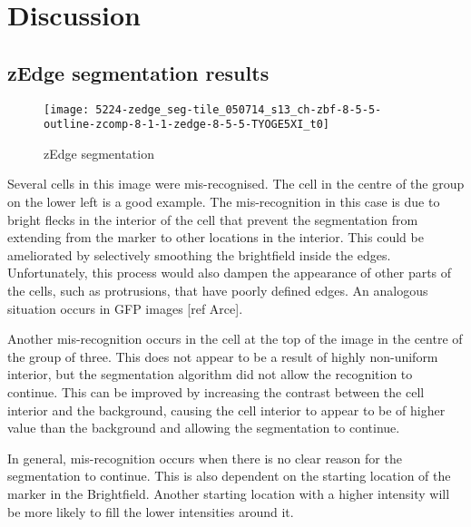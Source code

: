 
\chapter{Discussion}

\ifpdf
    \graphicspath{{Chapter7/Figs/Raster/}{Chapter7/Figs/PDF/}{Chapter7/Figs/}}
\else
    \graphicspath{{Chapter7/Figs/Vector/}{Chapter7/Figs/}}
\fi

\section{zEdge segmentation results}

\begin{figure}[htbp!]
\centering
\texttt{[image: 5224-zedge\_seg-tile\_050714\_s13\_ch-zbf-8-5-5-outline-zcomp-8-1-1-zedge-8-5-5-TYOGE5XI\_t0]}
\caption{zEdge segmentation}
\label{fig:zedge_segmentation}
\end{figure}

Several cells in this image were mis-recognised. The cell in the centre of the group on the lower left is a good example. The mis-recognition in this case is due to bright flecks in the interior of the cell that prevent the segmentation from extending from the marker to other locations in the interior. This could be ameliorated by selectively smoothing the brightfield inside the edges. Unfortunately, this process would also dampen the appearance of other parts of the cells, such as protrusions, that have poorly defined edges. An analogous situation occurs in GFP images [ref Arce].

Another mis-recognition occurs in the cell at the top of the image in the centre of the group of three. This does not appear to be a result of highly non-uniform interior, but the segmentation algorithm did not allow the recognition to continue. This can be improved by increasing the contrast between the cell interior and the background, causing the cell interior to appear to be of higher value than the background and allowing the segmentation to continue.

In general, mis-recognition occurs when there is no clear reason for the segmentation to continue. This is also dependent on the starting location of the marker in the Brightfield. Another starting location with a higher intensity will be more likely to fill the lower intensities around it.


